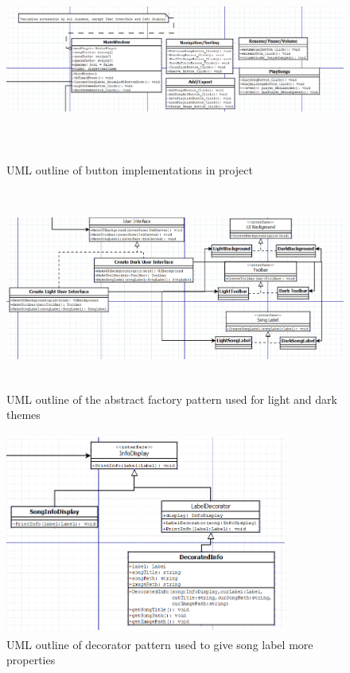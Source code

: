 \documentclass[10pt,conference,onecolumn,compsoc]{IEEEtran}
\begin{document}
\begin{figure}
\includegraphics[height=250px, width=450px]{Buttons_Scheme.png}
\caption{UML outline of button implementations in project}
\label{ButtonOutline}
\end{figure}

\begin{figure}
\includegraphics[height=250px, width=450px]{Light_Dark_Pattern.png}
\caption{UML outline of the abstract factory pattern used for light and dark themes}
\label{AbsFactOutline}
\end{figure}

\begin{figure}
\includegraphics[height=250px, width=350px]{Decorator_Pattern.png}
\caption{UML outline of decorator pattern used to give song label more properties}
\label{DecOutline}
\end{figure}
\end{document}
